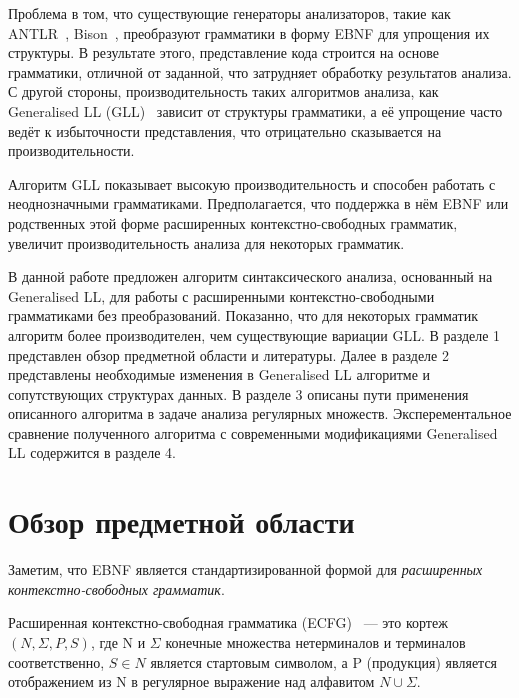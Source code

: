 Проблема в том, что существующие генераторы анализаторов, такие как ANTLR~\cite{ANTLR}, Bison~\cite{Bison}, преобразуют грамматики в форму EBNF
для упрощения их структуры. В результате этого, представление кода строится на основе грамматики, отличной от заданной,
что затрудняет обработку результатов анализа. С другой стороны, производительность таких алгоритмов анализа,
как Generalised LL (GLL)~\cite{scott2010gll}
зависит от структуры грамматики, а её упрощение часто ведёт к избыточности представления, что отрицательно сказывается на производительности.

Алгоритм GLL показывает высокую производительность и способен работать с неоднозначными грамматиками. 
Предполагается, что поддержка в нём EBNF или родственных этой форме расширенных контекстно-свободных грамматик,
увеличит производительность анализа для некоторых грамматик.

В данной работе предложен алгоритм синтаксического анализа, основанный на Generalised LL, для работы с расширенными
контекстно-свободными грамматиками без преобразований.
Показанно, что для некоторых грамматик алгоритм более производителен, чем существующие вариации GLL.
В разделе 1 представлен обзор предметной области и литературы. Далее в разделе 2 представлены необходимые изменения в Generalised LL алгоритме
и сопутствующих структурах данных. В разделе 3 описаны пути применения описанного алгоритма в задаче анализа регулярных множеств.
Эксперементальное сравнение полученного алгоритма с современными модификациями Generalised LL содержится в разделе 4.

\section{Обзор предметной области}
Заметим, что EBNF 
является стандартизированной формой для \textit{расширенных контекстно-свободных грамматик}.

\begin{mydef}
	Расширенная контекстно-свободная грамматика (ECFG)~\cite{ECFG} --- это кортеж $(N, \Sigma, P, S)$,
	где N и $\Sigma$ конечные множества нетерминалов и терминалов соответственно, 
	$S\in N$ является стартовым символом, а P (продукция) является отображением из N в
	регулярное выражение над алфавитом $N \cup \Sigma$.    
\end{mydef}


